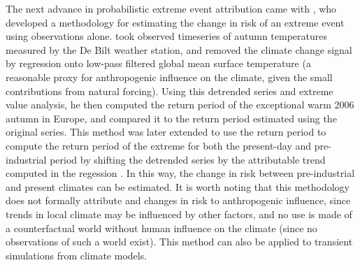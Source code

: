     The next advance in probabilistic extreme event attribution came with \citet{van_oldenborgh_how_2007}, who developed a methodology for estimating the change in risk of an extreme event using observations alone. \citeauthor{van_oldenborgh_how_2007} took observed timeseries of autumn temperatures measured by the De Bilt weather station, and removed the climate change signal by regression onto low-pass filtered global mean surface temperature (a reasonable proxy for anthropogenic influence on the climate, given the small contributions from natural forcing). Using this detrended series and extreme value analysis, he then computed the return period of the exceptional warm 2006 autumn in Europe, and compared it to the return period estimated using the original series. This method was later extended to use the return period to compute the return period of the extreme for both the present-day and pre-industrial period by shifting the detrended series by the attributable trend computed in the regession \citep[eg.][]{philip_protocol_2020,leach_anthropogenic_2020}. In this way, the change in risk between pre-industrial and present climates can be estimated. It is worth noting that this methodology does not formally attribute and changes in risk to anthropogenic influence, since trends in local climate may be influenced by other factors, and no use is made of a counterfactual world without human influence on the climate (since no observations of such a world exist). This method can also be applied to transient simulations from climate models.

